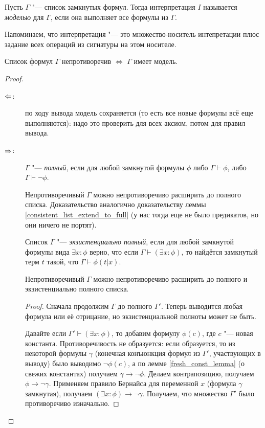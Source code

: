 \begin{Def}
	Пусть $\Gamma$ "--- список замкнутых формул.
	Тогда интерпретация $I$ называется \textsl{моделью} для $\Gamma$, если
	она выполняет все формулы из $\Gamma$.

	Напоминаем, что интерпретация "--- это множество-носитель интепретации плюс
	задание всех операций из сигнатуры на этом носителе.
\end{Def}
\begin{theorem}
	Список формул $\Gamma$ непротиворечив $\iff$ $\Gamma$ имеет модель.
\end{theorem}
\begin{proof}
	\begin{description}
		\item[$\Leftarrow$:]
			по ходу вывода модель сохраняется (то есть все новые формулы всё еще выполняются):
			надо это проверить для всех аксиом, потом для правил вывода.
		\item[$\Rightarrow$:]
			\begin{Def}
				$\Gamma$ "--- \textsl{полный}, если для любой замкнутой формулы $\phi$
				либо $\Gamma \vdash \phi$, либо $\Gamma \vdash \lnot \phi$.
			\end{Def}
			\begin{lemma}
				Непротиворечивый $\Gamma$ можно непротиворечиво расширить до полного списка.
				Доказательство аналогично доказательству леммы \ref{consistent_list_extend_to_full} (у нас тогда
				еще не было предикатов, но они ничего не портят).
			\end{lemma}
			\begin{Def}
				Список $\Gamma$ "--- \textsl{экзистенциально полный}, если для любой замкнутой формулы вида $\exists x \colon \phi$
				верно, что если $\Gamma \vdash (\exists x \colon \phi)$, то найдётся замкнутый терм $t$ такой,
				что $\Gamma \vdash \phi(t|x)$.
			\end{Def}
			\begin{lemma}
				Непротиворечивый $\Gamma$ можно непротиворечиво расширить до полного и экзистенциально полного списка.
			\end{lemma}
			\begin{proof}
				Сначала продолжим $\Gamma$ до полного $\Gamma'$.
				Теперь выводится любая формула или её отрицание, но экзистенциальной полноты может не быть.

				Давайте если $\Gamma' \vdash (\exists x \colon \phi)$, то добавим формулу $\phi(c)$, где $c$ "--- новая константа.
				Противоречивость не образуется: если образуется, то из некоторой формулы $\gamma$ (конечная конъюнкция формул из $\Gamma'$,
				участвующих в выводу) было выводимо $\lnot \phi(c)$,
				а по лемме \ref{fresh_const_lemma} (о свежих константах) получаем $\gamma \to \lnot \phi$.
				Делаем контрапозицию, получаем $\phi \to \lnot \gamma$.
				Применяем правило Бернайса для переменной $x$ (формула $\gamma$ замкнутая), получаем $(\exists x \colon \phi) \to \lnot \gamma$.
				Получаем, что множество $\Gamma'$ было противоречиво изначально.


\end{proof}
\end{description}
\end{proof}
